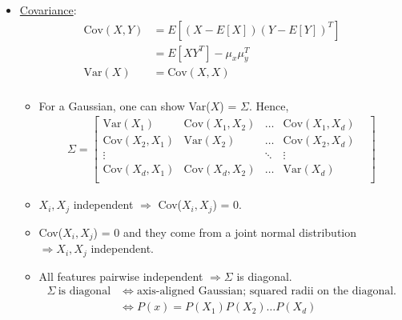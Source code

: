 \documentclass[10pt]{article}
\begin{document}
\begin{itemize}
			\item \underline{Covariance}:
				\begin{align*}
					\text{Cov}(X, Y) &= E[(X - E[X])(Y - E[Y])^{T}]\\
									&= E[XY^{T}] - \mu_{x}\mu_{y}^{T}\\
					\text{Var}(X) &= \text{Cov}(X, X)\\
				\end{align*}
				\begin{itemize}
					\item For a Gaussian, one can show Var($X$) = $\Sigma$. Hence,
						\begin{align*}
							\Sigma =
								\begin{bmatrix}
									\text{Var}(X_{1}) & \text{Cov}(X_{1},X_{2}) & \dots & \text{Cov}(X_{1},X_{d})\\
									\text{Cov}(X_{2},X_{1})  & \text{Var}(X_{2}) & \dots & \text{Cov}(X_{2}, X_{d})\\
									\vdots & & \ddots & \vdots &\\
									\text{Cov}(X_{d},X_{1}) & \text{Cov}(X_{d},X_{2}) & \dots & \text{Var}(X_{d})\\
								\end{bmatrix}
						\end{align*}	
					\item $X_{i}, X_{j}$ independent $\Rightarrow$ Cov($X_{i}, X_{j}$) = 0.
					\item Cov($X_{i}, X_{j}$) = 0 and they come from a joint normal distribution $\Rightarrow X_{i}, X_{j}$ independent.
					\item All features pairwise independent $\Rightarrow \Sigma$ is diagonal.
						\begin{align*}
							\Sigma \ \text{is diagonal} &\Leftrightarrow \text{axis-aligned Gaussian; squared radii on the diagonal}.\\
							&\Leftrightarrow P(x) = P(X_{1})P(X_{2}) \dots P(X_{d})\\
						\end{align*}

\begin{center}						
\end{center}
\end{itemize}
\end{itemize}
\end{document}

